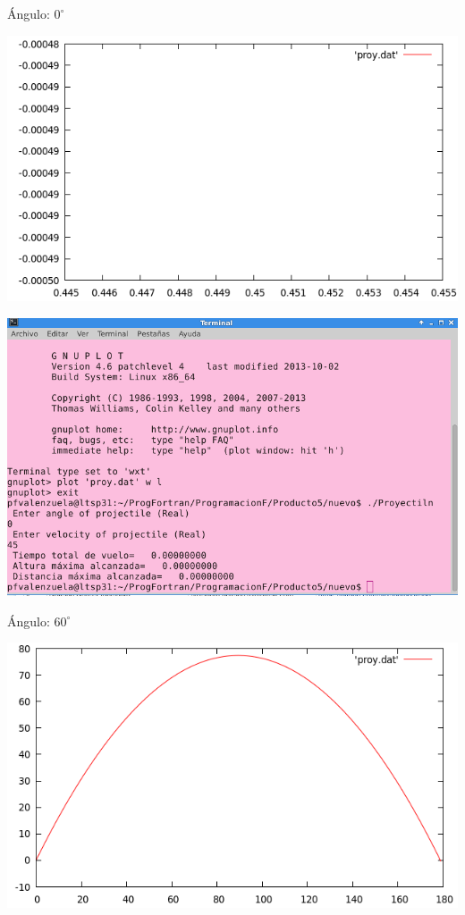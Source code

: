 \documentclass[12pt]{article}
\begin{document}
Ángulo: $0^{\circ}$
\begin{center}
\includegraphics[scale=0.6]{Grafica0.png}
\end{center}

\begin{center}
\includegraphics[scale=0.6]{Resultados0.png}
\end{center}


Ángulo: $60^{\circ}$
\begin{center}
\includegraphics[scale=0.6]{Grafica60.png}
\end{center}
\end{document}
